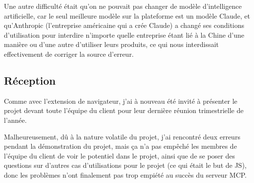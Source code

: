 \begin{flushleft}
  Une autre difficulté était qu'on ne pouvait pas changer de modèle
  d'intelligence artificielle, car le seul meilleure modèle sur la
  plateforme est un modèle Claude, et qu'Anthropic (l'entreprise
  américaine qui a crée Claude) a changé ses conditions d'utilisation
  pour interdire n'importe quelle entreprise étant lié à la Chine d'une
  manière ou d'une autre d'utiliser leurs produits, ce qui nous
  interdissait effectivement de corriger la source d'erreur.
\end{flushleft}

\newpage

\subsection*{Réception}

\begin{flushleft}
  Comme avec l'extension de navigateur, j'ai à nouveau été
  invité à présenter le projet devant toute l'équipe du client
  pour leur dernière réunion trimestrielle de l'année.
\end{flushleft}

\begin{flushleft}
  Malheureusement, dû à la nature volatile du projet, j'ai
  rencontré deux erreurs pendant la démonstration du projet,
  mais ça n'a pas empêché les membres de l'équipe du client
  de voir le potentiel dans le projet, ainsi que de se poser
  des questions sur d'autres cas d'utilisations pour le projet
  (ce qui était le but de JS), donc les problèmes n'ont
  finalement pas trop empiété au succès du serveur MCP.\@
\end{flushleft}
